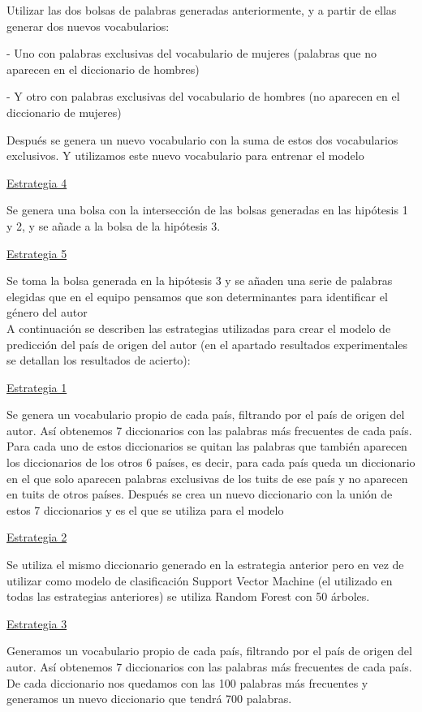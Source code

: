 \documentclass[11pt,a4paper]{article}
\begin{document}
Utilizar las dos bolsas de palabras generadas anteriormente, y a partir de ellas generar  dos nuevos vocabularios:

- Uno con palabras exclusivas del vocabulario de mujeres (palabras que no aparecen en el diccionario de hombres)

- Y otro con palabras exclusivas del vocabulario de hombres (no aparecen en el diccionario de mujeres)

Después se genera un nuevo vocabulario con la suma de estos dos vocabularios exclusivos. Y utilizamos este nuevo vocabulario para entrenar el modelo

\underline{Estrategia 4}

Se genera una bolsa con la intersección de las bolsas generadas en las hipótesis 1 y 2, y se añade a la bolsa de la hipótesis 3.

\underline{Estrategia 5}

Se toma la bolsa generada en la hipótesis 3 y se añaden una serie de palabras elegidas que en el equipo pensamos que son determinantes para identificar el género del autor
 \\
   
A continuación se describen las estrategias utilizadas para crear el modelo de predicción del país de origen del autor (en el apartado resultados experimentales se detallan los resultados de acierto):

\underline{Estrategia 1}

Se genera un vocabulario propio de cada país, filtrando por el país de origen del autor. Así obtenemos 7 diccionarios con las palabras más frecuentes de cada país.
Para cada uno de estos diccionarios se quitan las palabras que también aparecen los diccionarios de los otros 6 países, es decir, para cada país queda un diccionario en el que solo aparecen palabras exclusivas de los tuits de ese país y no aparecen en  tuits de otros países.
Después se crea un nuevo diccionario con la unión de estos 7 diccionarios y es el que se utiliza para el modelo

\underline{Estrategia 2}

Se utiliza el mismo diccionario generado en la estrategia anterior pero en vez de utilizar como modelo de clasificación Support Vector Machine (el utilizado en todas las estrategias anteriores) se utiliza Random Forest con 50 árboles.

\underline{Estrategia 3}

Generamos un vocabulario propio de cada país, filtrando por el país de origen del autor. Así obtenemos 7 diccionarios con las palabras más frecuentes de cada país.
De cada diccionario nos quedamos con las 100 palabras más frecuentes y generamos un nuevo diccionario que tendrá 700 palabras.
\end{document}
